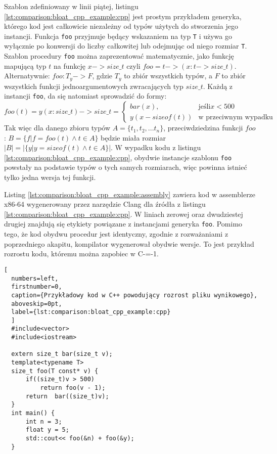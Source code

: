 Szablon zdefiniowany w linii piątej, listingu \ref{lst:comparison:bloat_cpp_example:cpp} jest prostym przykładem generyka, którego kod jest całkowicie niezależny od typów użytych do stworzenia jego instancji.
Funkcja \lstinline{foo} przyjmuje będący wskazaniem na typ \lstinline{T} i używa go wyłącznie po konwersji do liczby całkowitej lub odejmując od niego rozmiar \lstinline{T}.
Szablon procedury \lstinline{foo} można zaprezentować matematycznie, jako funkcję mapującą typ \(t\) na funkcję \(x -> size\_t\) czyli \( foo = t -> (x: t -> size\_t)\). Alternatywnie: \(foo : T_y -> F\), gdzie \(T_y\) to zbiór wszystkich typów, a \(F\) to zbiór wszystkich funkcji jednoargumentowych zwracających typ \(size\_t\).
Każdą z instancji \lstinline{foo}, da się natomiast sprowadzić do formy:\\
\(foo(t) = y(x: size\_t) -> size\_t = \begin{cases}
  bar(x), & \text{jeśli} x < 500 \\
  y(x - sizeof(t)) & \text{w przeciwnym wypadku}
\end{cases}\)\\
Tak więc dla danego zbioru typów \(A = \{t_1, t_2, ... t_n\}\), przeciwdziedzina funkcji \(foo\) : \(B = \{ f | f = foo(t) \land t \in A\}\) będzie miała rozmiar \(|B| = |\{y | y = sizeof(t) \land t \in A\}|\).
W wypadku kodu z listingu \ref{lst:comparison:bloat_cpp_example:cpp}, obydwie instancje szablonu \lstinline{foo} powstały na podstawie typów o tych samych rozmiarach, więc powinna istnieć tylko jedna wersja tej funkcji.

Listing \ref{lst:comparison:bloat_cpp_example:assembly} zawiera kod w assemblerze x86-64 wygenerowany przez narzędzie Clang dla źródła z listingu \ref{lst:comparison:bloat_cpp_example:cpp}.
W liniach zerowej oraz dwudziestej drugiej znajdują się etykiety powiązane z instancjami generyka \lstinline{foo}.
Pomimo tego, że kod obydwu procedur jest identyczny, zgodnie z rozważaniami z poprzedniego akapitu, kompilator wygenerował obydwie wersje.
To jest przykład rozrostu kodu, któremu można zapobiec w C-=-1.

\begin{lstlisting}[
  numbers=left,
  firstnumber=0,
  caption={Przykładowy kod w C++ powodujący rozrost pliku wynikowego},
  aboveskip=0pt,
  label={lst:comparison:bloat_cpp_example:cpp}
  ]
  #include<vector>
  #include<iostream>
  
  extern size_t bar(size_t v);
  template<typename T>
  size_t foo(T const* v) {
      if((size_t)v > 500)
          return foo(v - 1);
      return  bar((size_t)v);
  }
  int main() {
      int n = 3;
      float y = 5;
      std::cout<< foo(&n) + foo(&y);
  }
  


\end{lstlisting}

